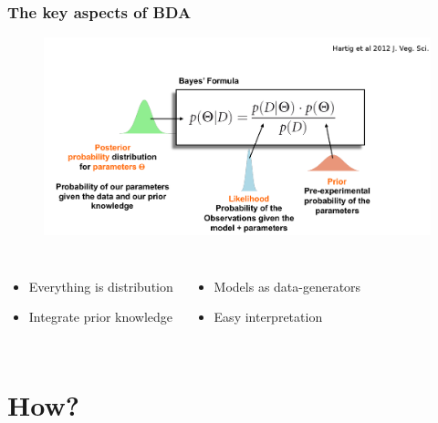 \documentclass{beamer}
\begin{document}
\begin{frame}
 \frametitle{\bf The key aspects of BDA}
 
 \begin{figure}
  \includegraphics[width=\textwidth,height=.75\textheight,keepaspectratio]{summ.png}
 \end{figure}
 
 \begin{columns}
   \begin{itemize}
    \item Everything is distribution
    \item Integrate prior knowledge
   \end{itemize}
   
    \begin{itemize}
     \item Models as data-generators
     \item Easy interpretation
    \end{itemize}


 \end{columns}


 
\end{frame}

\section{How?}
\end{document}
